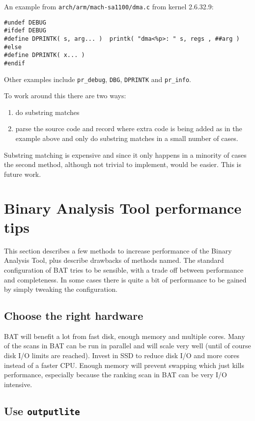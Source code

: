 \documentclass[10pt]{article}
\begin{document}
An example from \texttt{arch/arm/mach-sa1100/dma.c} from kernel 2.6.32.9:

\begin{verbatim}
#undef DEBUG
#ifdef DEBUG
#define DPRINTK( s, arg... )  printk( "dma<%p>: " s, regs , ##arg )
#else
#define DPRINTK( x... )
#endif
\end{verbatim}

Other examples include \texttt{pr\_debug}, \texttt{DBG}, \texttt{DPRINTK} and
\texttt{pr\_info}.

To work around this there are two ways:

\begin{enumerate}
\item do substring matches
\item parse the source code and record where extra code is being added as in
the example above and only do substring matches in a small number of cases.
\end{enumerate}

Substring matching is expensive and since it only happens in a minority of
cases the second method, although not trivial to implement, would be easier.
This is future work.

\section{Binary Analysis Tool performance tips}

This section describes a few methods to increase performance of the Binary
Analysis Tool, plus describe drawbacks of methods named. The standard
configuration of BAT tries to be sensible, with a trade off between performance
and completeness. In some cases there is quite a bit of performance to be
gained by simply tweaking the configuration.

\subsection{Choose the right hardware}

BAT will benefit a lot from fast disk, enough memory and multiple cores. Many
of the scans in BAT can be run in parallel and will scale very well (until
of course disk I/O limits are reached). Invest in SSD to reduce disk I/O and
more cores instead of a faster CPU. Enough memory will prevent swapping which
just kills performance, especially because the ranking scan in BAT can be very
I/O intensive.

\subsection{Use \texttt{outputlite}}
\end{document}
